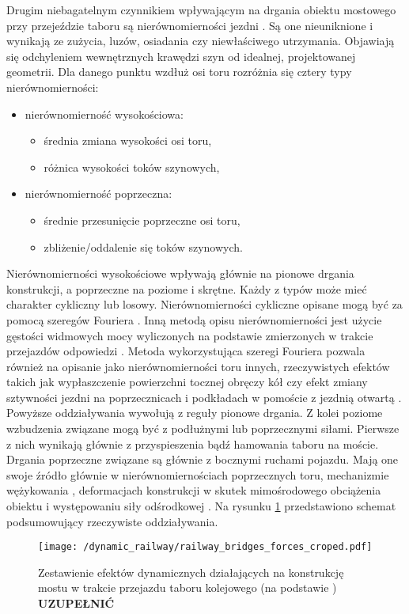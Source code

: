Drugim niebagatelnym czynnikiem wpływającym na drgania obiektu mostowego przy przejeździe taboru są nierównomierności jezdni \parencite{Ladislav1996,Dias2008}. Są one nieuniknione i wynikają ze zużycia, luzów, osiadania czy niewłaściwego utrzymania. Objawiają się odchyleniem wewnętrznych krawędzi szyn od idealnej, projektowanej geometrii. Dla danego punktu wzdłuż osi toru rozróżnia się cztery typy nierównomierności:
\begin{itemize}[noitemsep]
	\item nierównomierność wysokościowa:
	\begin{itemize}
		\item średnia zmiana wysokości osi toru,
		\item różnica wysokości toków szynowych,
	\end{itemize}
	\item nierównomierność poprzeczna:
	\begin{itemize}
		\item średnie przesunięcie poprzeczne osi toru,
		\item zbliżenie/oddalenie się toków szynowych.
	\end{itemize}
\end{itemize}
Nierównomierności wysokościowe wpływają głównie na pionowe drgania konstrukcji, a poprzeczne na poziome i skrętne. Każdy z typów może mieć charakter cykliczny lub losowy. Nierównomierności cykliczne opisane mogą być za pomocą szeregów Fouriera \parencite{Ladislav1996}. Inną metodą opisu nierównomierności jest użycie gęstości widmowych mocy wyliczonych na podstawie zmierzonych w trakcie przejazdów odpowiedzi \parencite{Claus1998,Dias2008}. Metoda wykorzystująca szeregi Fouriera pozwala również na opisanie jako nierównomierności toru innych, rzeczywistych efektów takich jak wypłaszczenie powierzchni tocznej obręczy kół \parencite{Zhou2020} czy efekt zmiany sztywności jezdni na poprzecznicach i podkładach w pomoście z jezdnią otwartą \parencite{Fryba1999}. Powyższe oddziaływania wywołują z reguły pionowe drgania. Z kolei poziome wzbudzenia związane mogą być z podłużnymi lub poprzecznymi siłami. Pierwsze z nich wynikają głównie z przyspieszenia bądź hamowania taboru na moście. Drgania poprzeczne związane są głównie z bocznymi ruchami pojazdu. Mają one swoje źródło głównie w nierównomiernościach poprzecznych toru, mechanizmie wężykowania \parencite{Babe2016}, deformacjach konstrukcji w skutek mimośrodowego obciążenia obiektu i występowaniu siły odśrodkowej \parencite{Dias2008}. Na rysunku \ref{fig:railway_dynamic_forces} przedstawiono schemat podsumowujący rzeczywiste oddziaływania.
\begin{figure}[h]
	\centering
	\texttt{[image: /dynamic\_railway/railway\_bridges\_forces\_croped.pdf]} 
	\captionsetup{justification=centering}
	\caption{Zestawienie efektów dynamicznych działających na konstrukcję mostu w trakcie przejazdu taboru kolejowego (na podstawie \parencite{Ladislav1996}) \textbf{UZUPEŁNIĆ}}
	\label{fig:railway_dynamic_forces}
\end{figure}


